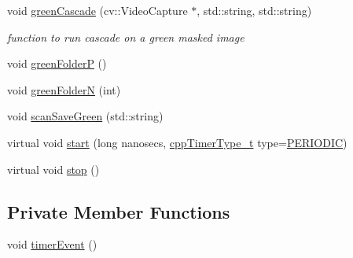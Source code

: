 \begin{DoxyCompactItemize}
void \hyperlink{classCamera_afa26f268b99c90b239592006bad6c5a5}{green\+Cascade} (cv\+::\+Video\+Capture $\ast$, std\+::string, std\+::string)
\begin{DoxyCompactList}\small\item\em function to run cascade on a green masked image \end{DoxyCompactList}\item 
void \hyperlink{classCamera_ac8f74b6c456d6fc7e9e83e746f8fc6c5}{green\+FolderP} ()
\item 
void \hyperlink{classCamera_ac212835924bf4cee1b8c477a6b79f4d2}{green\+FolderN} (int)
\item 
void \hyperlink{classCamera_a06cf0ed4a2b79d95637ddeb3301d3856}{scan\+Save\+Green} (std\+::string)
\item 
virtual void \hyperlink{classCppTimer_a64989025caa3c030c6c397ca76a2d20b}{start} (long nanosecs, \hyperlink{CppTimer_8h_a110d07ab6a96d7815149d3d95435790a}{cpp\+Timer\+Type\+\_\+t} type=\hyperlink{CppTimer_8h_a110d07ab6a96d7815149d3d95435790aae4379d044711537d9ce3b3b58c575c58}{P\+E\+R\+I\+O\+D\+IC})
\item 
virtual void \hyperlink{classCppTimer_a4bb95ddee98a536d0818b8f6096bf7e7}{stop} ()
\end{DoxyCompactItemize}
\subsection*{Private Member Functions}
\begin{DoxyCompactItemize}
\item 
void \hyperlink{classCamera_afcf6ca7256cd36f2f4a5ba088d67090a}{timer\+Event} ()
\end{DoxyCompactItemize}
